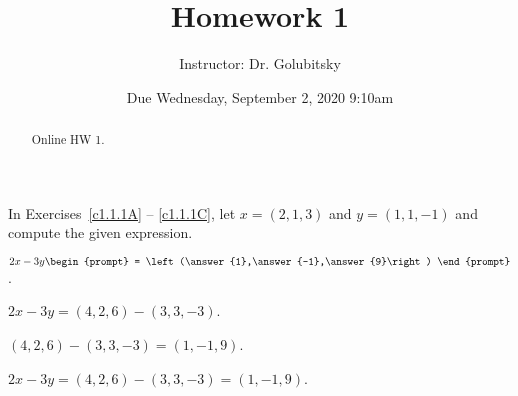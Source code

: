 \documentclass{ximera}
\title{Homework 1}
\author{Instructor: Dr. Golubitsky}
\date{Due Wednesday, September 2, 2020 \@ 9:10am}
\begin{document}
\begin{abstract}
Online HW 1.
\end{abstract}
\maketitle


\problemlabel

\noindent In Exercises~\ref{c1.1.1A} -- \ref{c1.1.1C}, let $x=(2,1,3)$ and 
$y=(1,1,-1)$ and compute the given expression.


\begin{exercise}  \label{c1.1.1B}
  $2x-3y\begin{prompt}
    = \left(\answer{1},\answer{-1},\answer{9}\right)
  \end{prompt}$.
  \begin{hint}
    $2x - 3y = (4,2,6) - (3,3,-3)$.
  \end{hint}
  \begin{hint}
    $(4,2,6) - (3,3,-3) = (1,-1,9)$.
  \end{hint}  

\begin{solution}
\ans $2x - 3y = (4,2,6) - (3,3,-3) = (1,-1,9)$.

\end{solution}
\end{exercise}





\problemlabel
\end{document}
